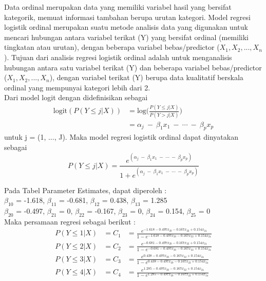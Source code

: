 \begin{sloppypar}
Data ordinal merupakan data yang memiliki variabel hasil yang bersifat kategorik, memuat informasi tambahan berupa urutan kategori. Model regresi logistik ordinal merupakan suatu metode analisis data yang digunakan untuk mencari hubungan antara variabel terikat (Y) yang bersifat ordinal (memiliki tingkatan atau urutan), dengan beberapa variabel bebas/predictor ($X_1, X_2, ..., X_n$). 
Tujuan dari analisis regresi logistik ordinal adalah untuk menganalisis hubungan antara satu variabel terikat (Y) dan beberapa variabel bebas/predictor ($X_1, X_2, ..., X_n$), dengan variabel terikat (Y) berupa data kualitatif berskala ordinal yang mempunyai kategori lebih dari 2.
\\ Dari model logit dengan didefinisikan sebagai 
\begin{align*}
\text{logit}(P(Y \leq j|X)) &= \text{log} \bigg( \frac{P(Y \leq j|X)}{P(Y > j|X)} \bigg) \\ &= \alpha_j\ -\ \beta_{1} x_1\ -\ \cdots\ -\ \beta_{p} x_p 
\end{align*}
untuk j = (1, ..., J). Maka model regresi logistik ordinal dapat dinyatakan sebagai $$P(Y \leq j|X) = \frac{e^{(\alpha_j\ -\ \beta_{1} x_1\ -\ \cdots\ -\ \beta_{p} x_p)}}{1 + e^{(\alpha_j\ -\ \beta_{1} x_1\ -\ \cdots\ -\ \beta_{p} x_p)}}$$
\end{sloppypar}
\begin{test}{
    Pada Tabel Parameter Estimates, dapat diperoleh : \\
    $\beta_{10}$ = -1.618, $\beta_{11}$ = -0.681, $\beta_{12}$ = 0.438, $\beta_{13}$ = 1.285 \\
    $\beta_{20}$ = -0.497, $\beta_{21}$ = 0, $\beta_{22}$ = -0.167, $\beta_{23}$ = 0, $\beta_{24}$ = 0.154, $\beta_{25}$ = 0 \\
    Maka persamaan regresi sebagai berikut : \\
    \begin{equation*}
    \begin{aligned}
        P(Y \leq 1|X) &= C_1 &= \frac{e^{-1.618 - 0.497 x_{20} - 0.167 x_{22} + 0.154 x_{24}}}{1 - e^{-1.618 - 0.497 x_{20} - 0.167 x_{22} + 0.154 x_{24}}} \\
        P(Y \leq 2|X) &= C_2 &= \frac{e^{-0.681 - 0.497 x_{20} - 0.167 x_{22} + 0.154 x_{24}}}{1 - e^{-0.681 - 0.497 x_{20} - 0.167 x_{22} + 0.154 x_{24}}} \\
        P(Y \leq 3|X) &= C_3 &= \frac{e^{0.438 - 0.497 x_{20} - 0.167 x_{22} + 0.154 x_{24}}}{1 - e^{0.438 - 0.497 x_{20} - 0.167 x_{22} + 0.154 x_{24}}} \\
        P(Y \leq 4|X) &= C_4 &= \frac{e^{1.285 - 0.497 x_{20} - 0.167 x_{22} + 0.154 x_{24}}}{1 - e^{1.285 - 0.497 x_{20} - 0.167 x_{22} + 0.154 x_{24}}} \\
    \end{aligned}
    \end{equation*}
}
\end{test}

